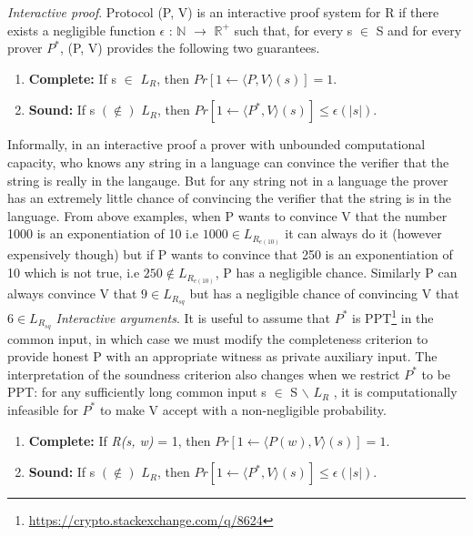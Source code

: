 \documentclass[a4paper]{article}
\begin{document}
\textit{Interactive proof}. Protocol (P, V) is an interactive proof system for R if there exists a negligible function \(\epsilon\) : $\mathbb{N}$ \(\to\) $\mathbb{R}^{+}$ such that, for every s $\in$ S and for every prover \textit{$P^{*}$}, (P, V) provides the following two guarantees.
\begin{enumerate}
  \item \textbf{Complete:}  If s $\in$ \textit{$L_R$}, then $Pr[1 \gets \langle P, V \rangle (s)] = 1$.
  \item \textbf{Sound:}  If s $(\notin)$ \textit{$L_R$}, then $Pr[1 \gets \langle P^{*}, V \rangle (s)] \le \epsilon(|s|)$.
\end{enumerate}
Informally, in an interactive proof a prover with unbounded computational capacity, who knows any string in a language can convince the verifier that the string is really in the langauge. But for any string not in a language the prover has an extremely little chance of convincing the verifier that the string is in the language. From above examples, when P wants to convince V that the number 1000 is an exponentiation of 10 i.e $ 1000 \in L_{R_{e(10)}} $ it can always do it (however expensively though) but if P wants to convince that 250 is an exponentiation of 10 which is not true, i.e $ 250 \notin \textit{$L_{R_{e(10)}}$} $, P has a negligible chance. Similarly P can always convince V that $ 9 \in L_{R_{sq}} $ but has a negligible chance of convincing V that $ 6 \in L_{R_{sq}} $
\newline
\newline
\textit{Interactive arguments}. It is useful to assume that \textit{$P^{*}$} is PPT\footnote{\url{https://crypto.stackexchange.com/q/8624}} in the common input, in which case we must modify the completeness criterion to provide honest P with an appropriate witness as private auxiliary input. The interpretation of the soundness criterion also changes when we restrict \textit{$P^{*}$} to be PPT: for any sufficiently long common input s $\in$ S \ensuremath{\backslash} \textit{$L_R$} , it is computationally infeasible for \textit{$P^{*}$} to make V accept with a non-negligible probability.
\begin{enumerate}
  \item \textbf{Complete:}  If \textit{R(s, w)} = 1, then $Pr[1 \gets \langle P(w), V \rangle (s)] = 1$.
  \item \textbf{Sound:}  If s $(\notin)$ \textit{$L_R$}, then $Pr[1 \gets \langle P^{*}, V \rangle (s)] \le \epsilon(|s|)$.
\end{enumerate}
\end{document}
